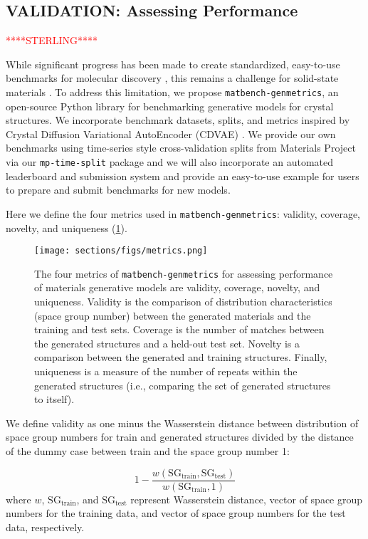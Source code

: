\subsection{VALIDATION: Assessing Performance}
\label{sec:validation}
\textcolor{red}{****STERLING****}

While significant progress has been made to create standardized, easy-to-use benchmarks for molecular discovery \cite{brownGuacaMolBenchmarkingModels2019}, this remains a challenge for solid-state materials \cite{spekCheckCIFValidationALERTS2020, xie_crystal_2022, zhao_physics_2022}. To address this limitation, we propose \texttt{matbench-genmetrics}, an open-source Python library for benchmarking generative models for crystal structures. We incorporate benchmark datasets, splits, and metrics inspired by Crystal Diffusion Variational AutoEncoder (CDVAE) \cite{xieCrystalDiffusionVariational2021}. We provide our own benchmarks using time-series style cross-validation splits from Materials Project via our \texttt{mp-time-split} package and we will also incorporate an automated leaderboard and submission system and provide an easy-to-use example for users to prepare and submit benchmarks for new models.

Here we define the four metrics used in \texttt{matbench-genmetrics}: validity, coverage, novelty, and uniqueness (\cref{fig:matbench-genmetrics}).

\begin{figure}
	\centering
	\texttt{[image: sections/figs/metrics.png]}
	\caption{The four metrics of \texttt{matbench-genmetrics} for assessing performance of materials generative models are validity, coverage, novelty, and uniqueness. Validity is the comparison of distribution characteristics (space group number) between the generated materials and the training and test sets. Coverage is the number of matches between the generated structures and a held-out test set. Novelty is a comparison between the generated and training structures. Finally, uniqueness is a measure of the number of repeats within the generated structures (i.e., comparing the set of generated structures to itself).}
	\label{fig:matbench-genmetrics}
\end{figure}

We define validity as one minus the Wasserstein distance between distribution of space group numbers for train and generated structures divided by the distance of the dummy case between train and the space group number 1:

\begin{equation} \label{eq:validity}
	1-\frac{w\left(\mathrm{SG}_{\mathrm{train}},\mathrm{SG}_{\mathrm{test}}\right)}{w\left(\mathrm{SG}_{\mathrm{train}},1\right)}
\end{equation}
where $w$, $\mathrm{SG}_{\mathrm{train}}$, and $\mathrm{SG}_{\mathrm{test}}$ represent Wasserstein distance, vector of space group numbers for the training data, and vector of space group numbers for the test data, respectively.

